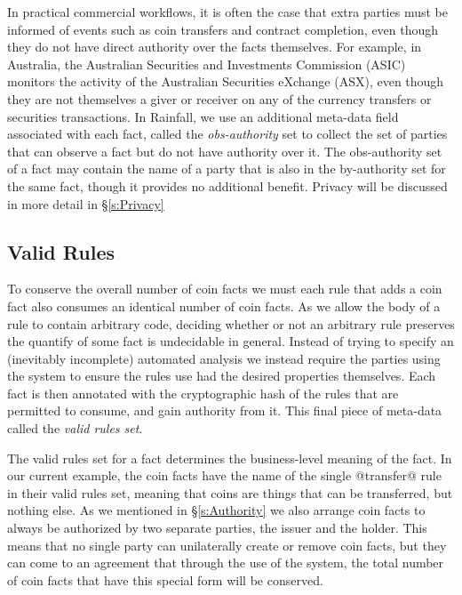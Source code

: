 In practical commercial workflows, it is often the case that extra parties must be informed of events such as coin transfers and contract completion, even though they do not have direct authority over the facts themselves. For example, in Australia, the Australian Securities and Investments Commission (ASIC) monitors the activity of the Australian Securities eXchange (ASX), even though they are not themselves a giver or receiver on any of the currency transfers or securities transactions. In Rainfall, we use an additional meta-data field associated with each fact, called the \emph{obs-authority} set to collect the set of parties that can observe a fact but do not have authority over it. The obs-authority set of a fact may contain the name of a party that is also in the by-authority set for the same fact, though it provides no additional benefit. Privacy will be discussed in more detail in \S\ref{s:Privacy}


\subsection{Valid Rules}
To conserve the overall number of coin facts we must each rule that adds a coin fact also consumes an identical number of coin facts. As we allow the body of a rule to contain arbitrary code, deciding whether or not an arbitrary rule preserves the quantify of some fact is undecidable in general. Instead of trying to specify an (inevitably incomplete) automated analysis we instead require the parties using the system to ensure the rules use had the desired properties themselves. Each fact is then annotated with the cryptographic hash of the rules that are permitted to consume, and gain authority from it. This final piece of meta-data called the \emph{valid rules set}.

The valid rules set for a fact determines the business-level meaning of the fact. In our current example, the coin facts have the name of the single @transfer@ rule in their valid rules set, meaning that coins are things that can be transferred, but nothing else. As we mentioned in \S\ref{s:Authority} we also arrange coin facts to always be authorized by two separate parties, the issuer and the holder. This means that no single party can unilaterally create or remove coin facts, but they can come to an agreement that through the use of the system, the total number of coin facts that have this special form will be conserved.


